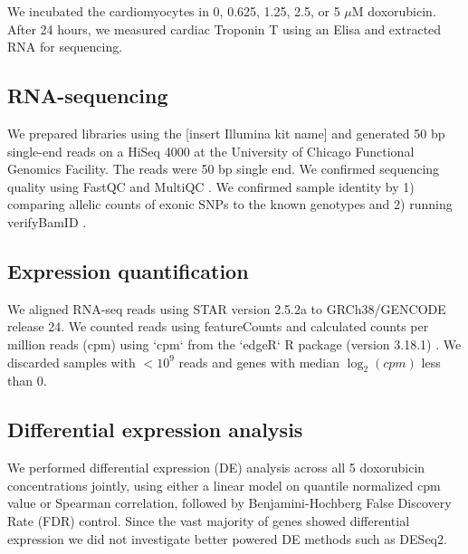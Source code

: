 \documentclass{article}
\begin{document}
{We incubated the cardiomyocytes in 0, 0.625, 1.25, 2.5, or 5 $\mu$M
doxorubicin. After 24 hours, we measured cardiac Troponin T using an
Elisa and extracted RNA for sequencing.

\subsection*{RNA-sequencing}

We prepared libraries using the [insert Illumina kit name] and
generated 50 bp single-end reads on a HiSeq 4000 at the University of
Chicago Functional Genomics Facility. The reads were 50 bp single
end. We confirmed sequencing quality using FastQC and MultiQC
\cite{Ewels2016}.  We confirmed sample identity by 1) comparing
allelic counts of exonic SNPs to the known genotypes and 2) running
verifyBamID \cite{Jun2012}.

\subsection*{Expression quantification}

We aligned RNA-seq reads using STAR version 2.5.2a \cite{Dobin2013} to GRCh38/GENCODE release 24. We counted reads using featureCounts \cite{Liao2014} and calculated counts per million reads (cpm) using `cpm` from the `edgeR` R package (version 3.18.1) \cite{Robinson2010}. We discarded samples with $<10^9$ reads and genes with median $\log_2(cpm)$ less than $0$.

\subsection*{Differential expression analysis} 

We performed differential expression (DE) analysis across all 5 doxorubicin concentrations jointly, using either a linear model on quantile normalized cpm value or Spearman correlation, followed by Benjamini-Hochberg False Discovery Rate (FDR) control. Since the vast majority of genes showed differential expression we did not investigate better powered DE methods such as DESeq2. 

}
\end{document}
